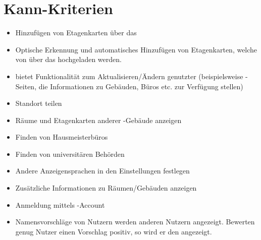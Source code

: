 \section{Kann-Kriterien}

\begin{itemize}

    \item Hinzufügen von Etagenkarten über das 
    \item Optische Erkennung und automatisches Hinzufügen von Etagenkarten,
     welche von %
     über das %
      hochgeladen werden.
    \item %
     bietet Funktionalität zum Aktualisieren/Ändern genutzter %
      (beispielsweise %
     -Seiten, die Informationen zu Gebäuden, Büros etc. zur Verfügung stellen)
    \item Standort teilen 
    \item Räume und Etagenkarten anderer %
    -Gebäude anzeigen
    \item Finden von Hausmeisterbüros
    \item Finden von universitären Behörden
    \item Andere Anzeigensprachen in den Einstellungen festlegen
    \item Zusätzliche Informationen zu Räumen/Gebäuden anzeigen
    \item Anmeldung mittels %
    -Account
    \item Namensvorschläge von Nutzern werden anderen Nutzern angezeigt. Bewerten genug Nutzer einen 
    Vorschlag positiv, so wird er den %
     angezeigt.
    
        

\end{itemize}